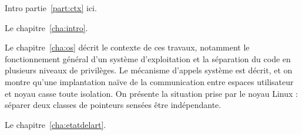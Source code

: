 \begin{headingpage}

Intro partie~\ref{part:ctx} ici.

Le chapitre~\ref{cha:intro}.

Le chapitre~\ref{cha:os} décrit le contexte de ces travaux, notamment le fonctionnement
général d'un système d'exploitation et la séparation du code en plusieurs
niveaux de privilèges. Le mécanisme d'appels système est décrit, et on montre
qu'une implantation naïve de la communication entre espaces utilisateur et noyau
casse toute isolation. On présente la situation prise par le noyau Linux :
séparer deux classes de pointeurs sensées être indépendante.

Le chapitre~\ref{cha:etatdelart}.

\end{headingpage}

